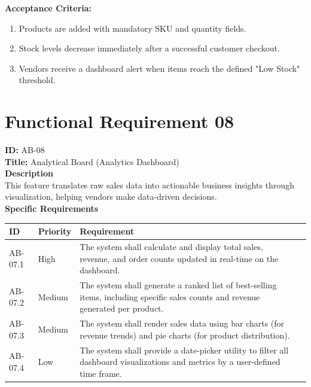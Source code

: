 \noindent\textbf{Acceptance Criteria:}
\begin{enumerate}
    \item Products are added with mandatory SKU and quantity fields.
    \item Stock levels decrease immediately after a successful customer checkout.
    \item Vendors receive a dashboard alert when items reach the defined "Low Stock" threshold.

\end{enumerate}

\section{Functional Requirement 08}

\textbf{ID:} AB-08\\
\textbf{Title:} Analytical Board (Analytics Dashboard)\\
\textbf{Description}\\
 This feature translates raw sales data into actionable business insights through visualization, helping vendors make data-driven decisions.\\
\textbf{Specific Requirements}

\begin{table}[H]
\centering
\label{tab:vendor-requirements}
\begin{tabular}{>{\raggedright\arraybackslash}p{2cm}>{\raggedright\arraybackslash}p{3cm}>{\raggedright\arraybackslash}p{7cm}>{\centering\arraybackslash}p{2cm}}
\toprule
\textbf{ID} & \textbf{Priority} & \textbf{Requirement} \\
\midrule
AB-07.1 & High & The system shall calculate and display total sales, revenue, and order counts updated in real-time on the dashboard.\\
\midrule
AB-07.2 & Medium & The system shall generate a ranked list of best-selling items, including specific sales counts and revenue generated per product.\\
\midrule
AB-07.3 & Medium & The system shall render sales data using bar charts (for revenue trends) and pie charts (for product distribution). \\
\midrule
AB-07.4 & Low & The system shall provide a date-picker utility to filter all dashboard visualizations and metrics by a user-defined time frame. \\
\bottomrule
\end{tabular}
\end{table}

